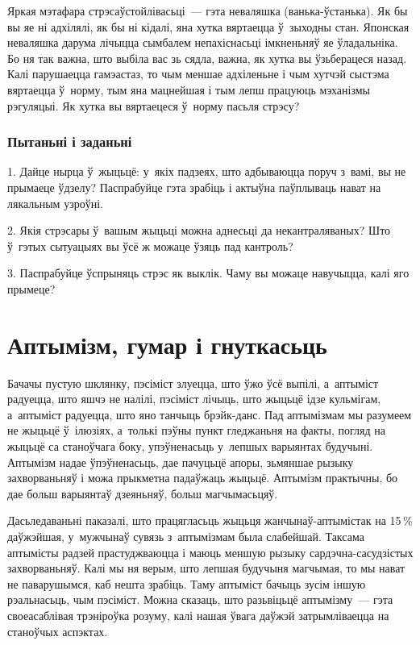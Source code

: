 Яркая мэтафара стрэсаўстойлівасьці~--- гэта неваляшка (ванька-ўстанька). Як бы вы яе ні адхілялі, як бы ні кідалі, яна хутка вяртаецца ў~зыходны стан. Японская неваляшка дарума лічыцца сымбалем непахіснасьці імкненьняў яе ўладальніка. Бо ня так важна, што выбіла вас зь сядла, важна, як хутка вы ўзьберацеся назад. Калі парушаецца гамэастаз, то чым меншае адхіленьне і чым хутчэй сыстэма вяртаецца ў~норму, тым яна мацнейшая і тым лепш працуюць мэханізмы рэгуляцыі. Як хутка вы вяртаецеся ў~норму пасьля стрэсу?

\subsubsection{Пытаньні і заданьні}

1. Дайце нырца ў~жыцьцё: у~якіх падзеях, што адбываюцца поруч з~вамі, вы не прымаеце ўдзелу? Паспрабуйце гэта зрабіць і актыўна паўплываць нават на лякальным узроўні.

2. Якія стрэсары ў~вашым жыцьці можна аднесьці да некантраляваных? Што ў~гэтых сытуацыях вы ўсё ж можаце ўзяць пад кантроль?

3. Паспрабуйце ўспрыняць стрэс як выклік. Чаму вы можаце навучыцца, калі яго прымеце?


\section{Аптымізм, гумар і гнуткасьць}

Бачачы пустую шклянку, пэсіміст злуецца, што ўжо ўсё выпілі, а~аптыміст радуецца, што яшчэ не налілі, пэсіміст лічыць, што жыцьцё ідзе кульмігам, а~аптыміст радуецца, што яно танчыць брэйк-данс. Пад аптымізмам мы разумеем не жыцьцё ў~ілюзіях, а~толькі пэўны пункт гледжаньня на факты, погляд на жыцьцё са станоўчага боку, упэўненасьць у~лепшых варыянтах будучыні. Аптымізм надае ўпэўненасьць, дае пачуцьцё апоры, зьмяншае рызыку захворваньняў і можа прыкметна падаўжаць жыцьцё. Аптымізм практычны, бо дае больш варыянтаў дзеяньняў, больш магчымасьцяў.

Дасьледаваньні паказалі, што працягласьць жыцьця жанчынаў-аптымістак на 15\,\% даўжэйшая, у~мужчынаў сувязь з~аптымізмам была слабейшай. Таксама аптымісты радзей прастуджваюцца і маюць меншую рызыку сардэчна-сасудзістых захворваньняў. Калі мы ня верым, што лепшая будучыня магчымая, то мы нават не паварушымся, каб нешта зрабіць. Таму аптыміст бачыць зусім іншую рэальнасьць, чым пэсіміст. Можна сказаць, што разьвіцьцё аптымізму~--- гэта своеасаблівая трэніроўка розуму, калі нашая ўвага даўжэй затрымліваецца на станоўчых аспэктах. 


